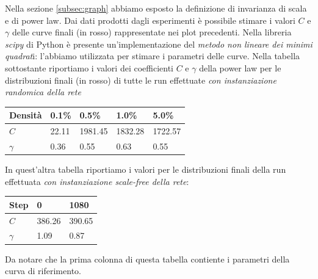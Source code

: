 \documentclass[a4paper,12pt]{article}
\begin{document}
Nella sezione \ref{subsec:graph} abbiamo esposto la definizione di invarianza di scala e di power law. Dai dati prodotti dagli esperimenti è possibile stimare i valori $C$ e $\gamma$ delle curve finali (in rosso) rappresentate nei plot precedenti. Nella libreria \textit{scipy} di Python è presente un'implementazione del \textit{metodo non lineare dei minimi quadrat}i: l'abbiamo utilizzata per stimare i parametri delle curve.
Nella tabella sottostante riportiamo i valori dei coefficienti $C$ e $\gamma$ della power law per le distribuzioni finali (in rosso) di tutte le run effettuate \textit{con instanziazione randomica della rete} 
\begin{center}
    \begin{tabular}{| l | l | l | l | l |}
    \hline
    Densità & 0.1\% & 0.5\% & 1.0\% & 5.0\% \\ \hline \hline
	$C$ & 22.11 & 1981.45 & 1832.28 & 1722.57 \\ \hline
	$\gamma$ & 0.36 & 0.55 & 0.63 & 0.55 \\ \hline
    \end{tabular}
\end{center}
In quest'altra tabella riportiamo i valori per le distribuzioni finali della run effettuata \textit{con instanziazione scale-free della rete}:
\begin{center}
    \begin{tabular}{| l | l | l |}
    \hline
    Step & 0 & 1080 \\ \hline \hline
	$C$ & 386.26 & 390.65 \\ \hline
	$\gamma$ & 1.09 & 0.87 \\ \hline
    \end{tabular}
\end{center}
Da notare che la prima colonna di questa tabella contiente i parametri della curva di riferimento.
\end{document}
